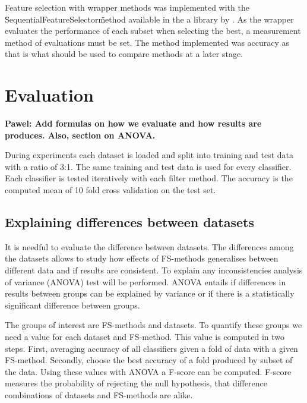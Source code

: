 Feature selection with wrapper methods was implemented with the \"SequentialFeatureSelector\" method available in the a library by \textcite{mlextend}. As the wrapper evaluates the performance of each subset when selecting the best, a measurement method of evaluations must be set. The method implemented was accuracy as that is what should be used to compare methods at a later stage.


\section{Evaluation}
\label{Evaluation}

\textbf{ Pawel: Add formulas on how we evaluate and how results are produces. Also, section on ANOVA. }



During experiments each dataset is loaded and split into training and test data with a ratio of 3:1. The same training and test data is used for every classifier. Each classifier is tested iteratively with each filter method. The accuracy is the computed mean of 10 fold cross validation on the test set.

\subsection{Explaining differences between datasets}

It is needful to evaluate the difference between datasets. The differences among the datasets allows to study how effects of FS-methods generalises between different data and if results are consistent. To explain any inconsistencies analysis of variance (ANOVA) test will be performed. ANOVA entails if differences in results between groups can be explained by variance or if there is a statistically significant difference between groups.

The groups of interest are FS-methods and datasets. To quantify these groups we need a value for each dataset and FS-method. This value is computed in two steps. First, averaging accuracy of all classifiers given a fold of data with a given FS-method. Secondly, choose the best accuracy of a fold produced by subset of the data. Using these values with ANOVA a F-score can be computed. F-score measures the probability of rejecting the null hypothesis, that difference combinations of datasets and FS-methods are alike.

